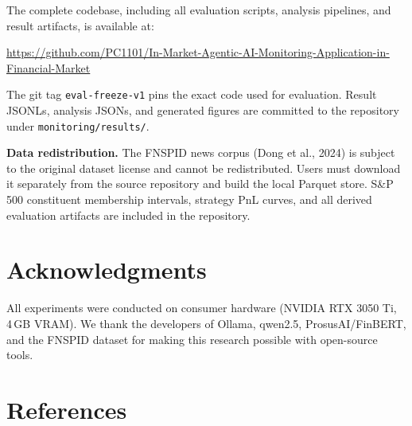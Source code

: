 \documentclass[11pt,a4paper]{article}
\begin{document}
The complete codebase, including all evaluation scripts, analysis pipelines,
and result artifacts, is available at:

\begin{center}
\url{https://github.com/PC1101/In-Market-Agentic-AI-Monitoring-Application-in-Financial-Market}
\end{center}

\noindent The git tag \texttt{eval-freeze-v1} pins the exact code used for
evaluation. Result JSONLs, analysis JSONs, and generated figures are committed
to the repository under \texttt{monitoring/results/}.

\textbf{Data redistribution.} The FNSPID news corpus (Dong et al., 2024) is
subject to the original dataset license and cannot be redistributed. Users
must download it separately from the source repository and build the local
Parquet store. S\&P 500 constituent membership intervals, strategy PnL
curves, and all derived evaluation artifacts are included in the repository.

\section*{Acknowledgments}

All experiments were conducted on consumer hardware (NVIDIA RTX 3050 Ti,
4\,GB VRAM). We thank the developers of Ollama, qwen2.5, ProsusAI/FinBERT,
and the FNSPID dataset for making this research possible with open-source
tools.

\section*{References}
\end{document}

